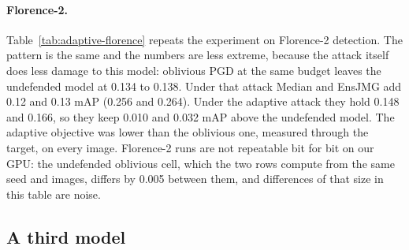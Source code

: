 \documentclass[11pt]{article}
\newcommand{\fl}{Florence-2}
\begin{document}
\begin{table}[t]
\centering\small
\caption{\fl{} detection under oblivious and adaptive PGD, first 1{,}000
images, $\epsilon=7/255$ in pixel space, 50 steps, one seed; clean mAP 0.360.
Columns as in Table~\ref{tab:adaptive}. The average objective was run for
EnsJMG on the first 300 images only (check iv). Geometric pseudo-scores
(Sec.~\ref{sec:disclosures}).}
\label{tab:adaptive-florence}
\end{table}

\paragraph{\fl{}.} Table~\ref{tab:adaptive-florence} repeats the experiment
on \fl{} detection. The pattern is the same and the numbers are less
extreme, because the attack itself does less damage to this model: oblivious
PGD at the same budget leaves the undefended model at 0.134 to 0.138. Under
that attack Median and EnsJMG add 0.12 and 0.13 mAP (0.256 and 0.264). Under
the adaptive attack they hold 0.148 and 0.166, so they keep 0.010 and 0.032
mAP above the undefended model. The adaptive objective was lower than the
oblivious one, measured through the target, on every image. \fl{} runs are
not repeatable bit for bit on our GPU: the undefended oblivious cell, which
the two rows compute from the same seed and images, differs by 0.005 between
them, and differences of that size in this table are noise.

\subsection{A third model}
\label{sec:third}
\end{document}
